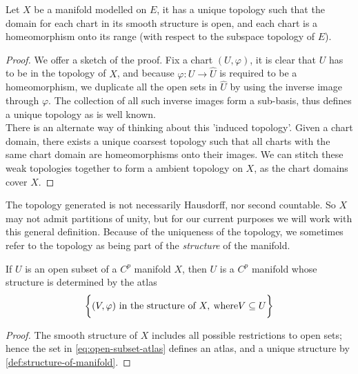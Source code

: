 \documentclass[../main-manifolds.tex]{subfiles}
\begin{document}
\begin{wts}\label{def:topology-unique-on-manifold}
    Let $X$ be a manifold modelled on $E$, it has a unique topology such that the domain for each chart in its smooth structure is open, and each chart is a homeomorphism onto its range (with respect to the subspace topology of $E$).
\end{wts}
\begin{proof}
    We offer a sketch of the proof. Fix a chart $(U,\varphi)$, it is clear that $U$ has to be in the topology of $X$, and because $\varphi: U\to \hat{U}$ is required to be a homeomorphism, we duplicate all the open sets in $\hat{U}$ by using the inverse image through $\varphi$. The collection of all such inverse images form a sub-basis, thus defines a unique topology as is well known.\\

    There is an alternate way of thinking about this 'induced topology'. Given a chart domain, there exists a unique coarsest topology such that all charts with the same chart domain are homeomorphisms onto their images. We can stitch these weak topologies together to form a ambient topology on $X$, as the chart domains cover $X$.
\end{proof}
\begin{remark}
    The topology generated is not necessarily Hausdorff, nor second countable. So $X$ may not admit partitions of unity, but for our current purposes we will work with this general definition. Because of the uniqueness of the topology, we sometimes refer to the topology as being part of the \emph{structure} of the manifold.
\end{remark}
\begin{wts}
    If $U$ is an open subset of a $C^p$ manifold $X$, then $U$ is a $C^p$ manifold whose structure is determined by the atlas
    \begin{equation}\label{eq:open-subset-atlas}
    \biggl\{{(V,\varphi) \text{ in the structure of }X,\:\text{where} V\subseteq U}\biggr\}
    \end{equation}
\end{wts}
\begin{proof}
    The smooth structure of $X$ includes all possible restrictions to open sets; hence the set in \cref{eq:open-subset-atlas} defines an atlas, and a unique structure by \cref{def:structure-of-manifold}.
\end{proof}
\end{document}

